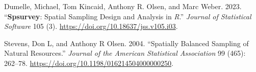 \documentclass[
  letterpaper,
  DIV=11,
  numbers=noendperiod]{scrartcl}
\newlength{\cslhangindent}
\newenvironment{CSLReferences}[2] %
 {\begin{list}{}{%
  \setlength{\itemindent}{0pt}
  \setlength{\leftmargin}{0pt}
  \setlength{\parsep}{0pt}
  \ifodd #1
   \setlength{\leftmargin}{\cslhangindent}
   \setlength{\itemindent}{-1\cslhangindent}
  \fi
  \setlength{\itemsep}{#2\baselineskip}}}
 {\end{list}}
\begin{document}
\label{refs}
\begin{CSLReferences}{1}{0}
Dumelle, Michael, Tom Kincaid, Anthony R. Olsen, and Marc Weber. 2023.
{``{\textbf{Spsurvey}}: Spatial Sampling Design and Analysis in
{\emph{R}}.''} \emph{Journal of Statistical Software} 105 (3).
\url{https://doi.org/10.18637/jss.v105.i03}.

Stevens, Don L, and Anthony R Olsen. 2004. {``Spatially Balanced
Sampling of Natural Resources.''} \emph{Journal of the American
Statistical Association} 99 (465): 262--78.
\url{https://doi.org/10.1198/016214504000000250}.

\end{CSLReferences}
\end{document}
